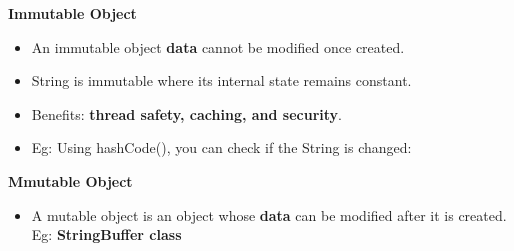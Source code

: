 \setlength{\columnsep}{3pt}
\begin{flushleft}
	\textbf{Immutable Object}
	\begin{itemize}
		\item An immutable object \textbf{data} cannot be modified once created. 
		\item String is immutable where its internal state remains constant.
		\item Benefits: \textbf{thread safety, caching, and security}.
		\item Eg: Using hashCode(), you can check if the String is changed:
		

	\end{itemize}

	\bigskip
	\textbf{Mmutable Object}
	\begin{itemize}
		\item A mutable object is an object whose \textbf{data} can be modified after it is created. Eg: \textbf{StringBuffer class}
		\bigskip
		
	\end{itemize}

\end{flushleft}
